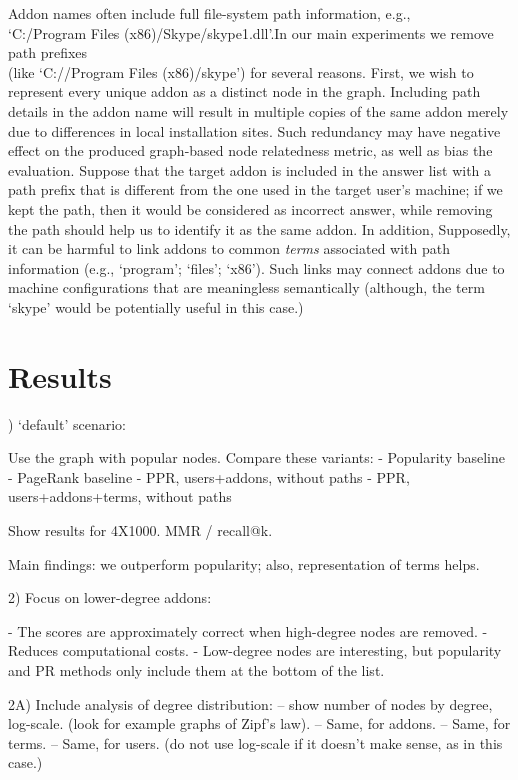 \documentclass[11pt,oneside]{book}
\let\Oldsection\section
\renewcommand{\section}{\FloatBarrier\Oldsection}
\begin{document}
Addon names often include full file-system path information, e.g., \\
`C:/Program Files (x86)/Skype/skype1.dll'.In our main experiments we remove path prefixes \\
(like `C://Program Files (x86)/skype') for several reasons. First, we wish to represent every unique addon as a distinct node in the graph. Including path details in the addon name will result in multiple copies of the same addon merely due to differences in local installation sites. Such redundancy may have negative effect on the produced  graph-based node relatedness metric, as well as bias the evaluation. 
Suppose that the target addon is included in the answer list with a path prefix that is different from the one used in the target user's machine; if we kept the path, then it would be considered as incorrect answer, while removing the path should help us to identify it as the same addon. In addition, Supposedly, it can be harmful to link addons to common {\it terms} associated with path information (e.g., `program'; `files'; `x86'). Such links may connect addons due to machine configurations that are meaningless semantically (although, the term `skype' would be potentially useful in this case.)


\section{Results}
\label{sec:user_main_results}

) `default' scenario:

Use the graph with popular nodes. Compare these variants:
- Popularity baseline
- PageRank baseline
- PPR, users+addons, without paths
- PPR, users+addons+terms, without paths

Show results for 4X1000. MMR / recall@k.

Main findings: we outperform popularity; also, representation of terms helps.

2) Focus on lower-degree addons:

- The scores are approximately correct when high-degree nodes are removed.
- Reduces computational costs.
- Low-degree nodes are interesting, but popularity and PR methods only include them at the bottom of the list.

2A) Include analysis of degree distribution: 
-- show number of nodes by degree, log-scale. (look for example graphs of Zipf's law).
-- Same, for addons.
-- Same, for terms.
-- Same, for users. (do not use log-scale if it doesn't make sense, as in this case.)
\end{document}
